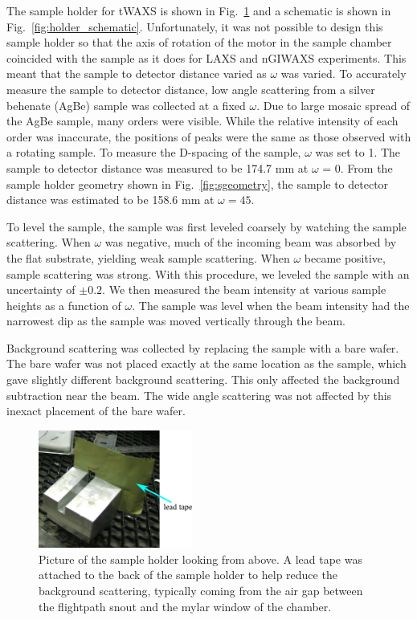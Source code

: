 The sample holder for tWAXS is shown in Fig.~\ref{fig:holder_picture} and a 
schematic is shown in Fig.~\ref{fig:holder_schematic}.  Unfortunately, it was not 
possible to design this sample holder so that the axis of rotation of the 
motor in the sample chamber coincided with the sample as it does for LAXS and 
nGIWAXS experiments.  This meant that the sample to detector distance varied 
as $\omega$ was varied. To accurately
measure the sample to detector distance, low angle scattering from a 
silver behenate (AgBe) sample was collected
at a fixed $\omega$. Due to large mosaic spread of the AgBe sample, many orders were
visible. While the relative intensity of each order was inaccurate, 
the positions of peaks were the same as those observed with a rotating sample.
To measure the D-spacing of the sample, $\omega$ was set to 1\textdegree.
The sample to detector distance was measured to be 174.7 mm 
at $\omega$ = 0\textdegree.
From the sample holder geometry shown in Fig.~\ref{fig:sgeometry},
the sample to detector distance was estimated to be 
158.6 mm at $\omega=45$\textdegree.

To level the sample, 
the sample was first leveled coarsely by watching the sample scattering. When
$\omega$ was negative, much of the incoming beam was absorbed by the 
flat substrate, yielding weak sample scattering. When $\omega$ became 
positive, sample scattering was strong. With this procedure, 
we leveled the sample with an uncertainty of $\pm 0.2$\textdegree. We
then measured the beam intensity at various sample heights 
as a function of $\omega$. 
The sample was 
level when the beam intensity had the narrowest dip as the sample
was moved vertically through the beam.

Background scattering was collected by replacing the sample with a bare 
wafer. The bare wafer was not placed exactly at the same location
as the sample, which gave slightly different background scattering.
This only affected the background subtraction near the beam. 
The wide angle scattering was not affected by
this inexact placement of the bare wafer. 
\newpage
\begin{figure}[htbp]
  \centering
  \includegraphics[width=0.45\textwidth]{figures/ripple/MMs/transmission/sample_holder1}
  \caption{Picture of the sample holder looking from above. A lead tape was
  attached to the back of the sample holder to help reduce the background 
  scattering, typically coming from the air gap between the flightpath snout
  and the mylar window of the chamber.}
  \label{fig:holder_picture}
\end{figure}

